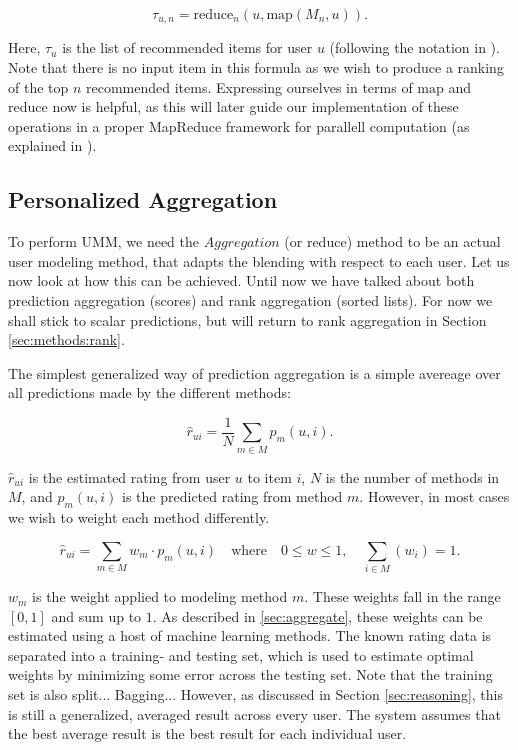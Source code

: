 \begin{equation*}
  \tau_{u,n} = \mathrm{reduce}_{n}(u, \mathrm{map}(M_{n},u)).
\end{equation*}

Here, $\tau_{u}$ is the list of recommended items for user $u$ (following the notation in \citet[p3]{Dwork2001}).
Note that there is no input item in this formula as we wish to produce a ranking of the top $n$ recommended items.
Expressing ourselves in terms of $\mathrm{map}$ and $\mathrm{reduce}$ now is helpful, as this will later
guide our implementation of these operations in a proper MapReduce framework
for parallell computation (as explained in \citet[p75]{Manning2008}).


\subsection{Personalized Aggregation}

To perform UMM, we need the $Aggregation$ (or $\mathrm{reduce}$) method to be an actual user modeling method,
that adapts the blending with respect to each user.
Let us now look at how this can be achieved.
Until now we have talked about both prediction aggregation (scores) and rank aggregation (sorted lists).
For now we shall stick to scalar predictions, but will return to rank aggregation in Section \ref{sec:methods:rank}.

The simplest generalized way of prediction aggregation is a simple avereage over all predictions made
by the different methods:

\begin{equation*}
  \hat{r}_{ui} = \frac{1}{N} \sum_{m \in M} p_m(u,i).
\end{equation*}

$\hat{r}_{ui}$ is the estimated rating from user $u$ to item $i$,
$N$ is the number of methods in $M$, and $p_m(u,i)$ is the predicted rating from method $m$.
However, in most cases we wish to weight each method differently.

\begin{equation*}
  \hat{r}_{ui} = \sum_{m \in M} w_{m} \cdot p_m(u,i) \quad \text{where} \quad 0 \leq w \leq 1, \quad \sum_{i \in M} (w_i) = 1.
\end{equation*}

$w_m$ is the weight applied to modeling method $m$. These weights fall in the range $[0,1]$ and sum up to $1$.
As described in \ref{sec:aggregate}, these weights can be estimated using a host of machine learning methods.
The known rating data is separated into a training- and testing set, which is used to estimate optimal weights
by minimizing some error across the testing set.
Note that the training set is also split... Bagging...
However, as discussed in Section \ref{sec:reasoning},
this is still a generalized, averaged result across every user. 
The system assumes that the best average result is the best result for each individual user.

